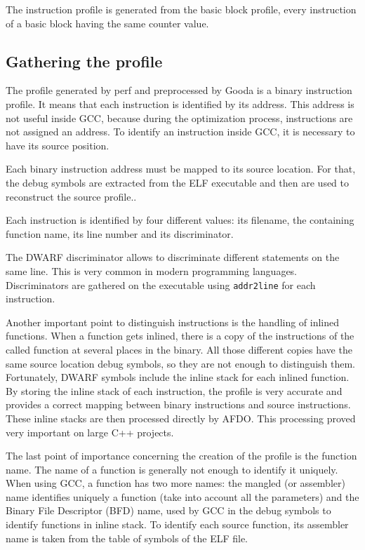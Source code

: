 \documentclass[9pt,english,twocolumn,letter]{article}
\begin{document}
The instruction profile is generated from the basic block profile, every instruction of a basic block having the same counter value.

\subsection{Gathering the profile}
\label{sec:gathering-profile}

The profile generated by perf and preprocessed by Gooda is a binary instruction profile. It means that each instruction is identified by its address. This address is not useful inside GCC, because during the optimization process, instructions are not assigned an address. To identify an instruction inside GCC, it is necessary to have its source position.

Each binary instruction address must be mapped to its source location. For that, the debug symbols are extracted from the ELF executable and then are used to reconstruct the source profile..

Each instruction is identified by four different values: its filename, the containing function name, its line number and its discriminator.

The DWARF discriminator allows to discriminate different statements on the same line. This is very common in modern programming languages. Discriminators are gathered on the executable using \texttt{addr2line} for each instruction.

Another important point to distinguish instructions is the handling of inlined functions. When a function gets inlined, there is a copy of the instructions of the called function at several places in the binary. All those different copies have the same source location debug symbols, so they are not enough to distinguish them. Fortunately, DWARF symbols include the inline stack for each inlined function. By storing the inline stack of each instruction, the profile is very accurate and provides a correct mapping between binary instructions and source instructions. These inline stacks are then processed directly by AFDO. This processing proved very important on large C++ projects.

The last point of importance concerning the creation of the profile is the function name. The name of a function is generally not enough to identify it uniquely. When using GCC, a function has two more names: the mangled (or assembler) name identifies uniquely a function (take into account all the parameters) and the Binary File Descriptor (BFD) name, used by GCC in the debug symbols to identify functions in inline stack. To identify each source function, its assembler name is taken from the table of symbols of the ELF file.
\end{document}
